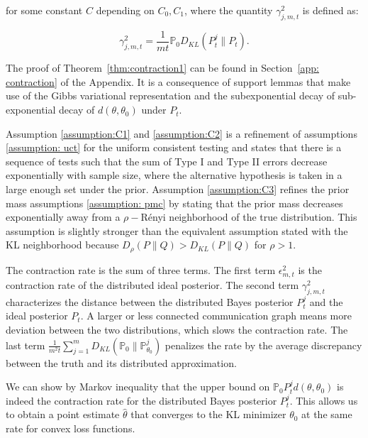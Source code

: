\documentclass[twoside,11pt]{article}
\numberwithin{equation}{section}
\newcommand\bP{\mathbb{P}}
\begin{document}
{\begin{theorem}
for some constant $C$ depending on $C_0, C_1$, where the quantity $\gamma_{j,m,t}^2$ is defined as:

\begin{equation*}
\gamma_{j,m,t}^2 =  \frac{1}{mt} \bP_0 D_{KL}(P_t^j \parallel P_t). 
\end{equation*}
\end{theorem}
The proof of Theorem~\ref{thm:contraction1} can be found in Section~\ref{app: contraction} of the Appendix. It is a consequence of support lemmas that make use of the Gibbs variational representation and the subexponential decay of sub-exponential decay of $d(\theta, \theta_0)$ under $P_t$. 

Assumption \eqref{assumption:C1} and  \eqref{assumption:C2} is a refinement of assumptions \ref{assumption: uct} for the uniform consistent testing and states that there is a sequence of tests such that the sum of Type I and Type II errors decrease exponentially with sample size, where the alternative hypothesis is taken in a large enough set under the prior. Assumption \eqref{assumption:C3} refines the prior mass assumptions \ref{assumption: pmc} by stating that the prior mass decreases exponentially away from a $\rho-$Rényi neighborhood of the true distribution. This assumption is slightly stronger than the equivalent assumption stated with the KL neighborhood because $D_\rho(P \parallel Q) > D_{KL}(P \parallel Q)$ for $\rho >1 $.   

The contraction rate is the sum of three terms. The first term $\epsilon_{m,t}^2$ is the contraction rate of the distributed ideal posterior. The second term $\gamma_{j,m,t}^2$ characterizes the distance between the distributed Bayes posterior $P_t^j$ and the ideal posterior $ P_t$. A larger or less connected communication graph means more deviation between the two distributions, which slows the contraction rate. The last term $\frac{1}{m^2 t} \sum_{j = 1}^m D_{KL}(\bP_0 \parallel \bP_{\theta_0}^j)$ penalizes the rate by the average discrepancy between the truth and its distributed approximation. 

We can show by Markov inequality that the upper bound on $ \bP_0 P_t^j d(\theta, \theta_0)$ is indeed the contraction rate for the distributed Bayes posterior $P_t^j$. This allows us to obtain a point estimate $\hat \theta$ that converges to the KL minimizer $\theta_0$ at the same rate for convex loss functions. 

}
\end{document}
